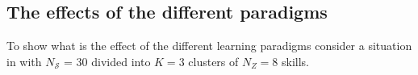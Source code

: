\subsection{The effects of the different paradigms}
To show what is the effect of the different learning paradigms consider a situation in with $N_\mathcal{S}$ = 30 divided into $K=3$ clusters of $N_Z = 8$ skills.
\begin{figure}[!h]
	\centering
	\hspace*{\fill}
	\hspace*{\fill}
	\\
	\hspace*{\fill}
	\hspace*{\fill}
	\\
	\hspace*{\fill}

\end{figure}
